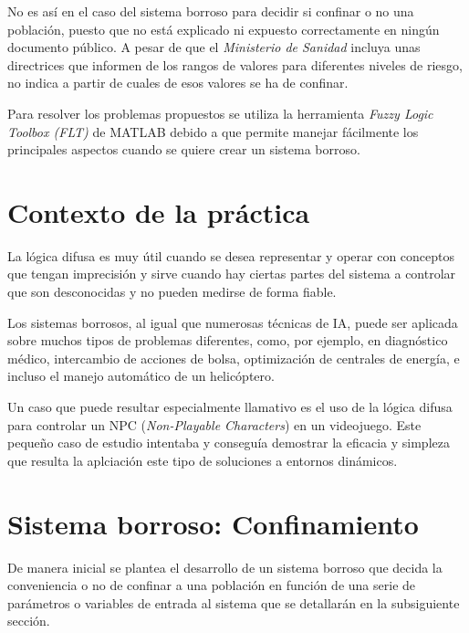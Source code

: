 \documentclass[12pt,a4paper, xcolor=table]{article}
\begin{document}
\vspace{2mm}

No es así en el caso del sistema borroso para decidir si confinar o no una población, puesto que no está explicado ni expuesto correctamente en ningún documento público. A pesar de que el \textit{Ministerio de Sanidad}\cite{poblacion} incluya unas directrices que informen de los rangos de valores para diferentes niveles de riesgo, no indica a partir de cuales de esos valores se ha de confinar.

\vspace{4mm}

Para resolver los problemas propuestos se utiliza la herramienta \textit{Fuzzy Logic Toolbox (FLT)} de MATLAB debido a que permite manejar fácilmente los principales aspectos cuando se quiere crear un sistema borroso.

\newpage

\section{Contexto de la práctica}

La lógica difusa es muy útil cuando se desea representar y operar con conceptos que tengan imprecisión y sirve cuando hay ciertas partes del sistema a controlar que son desconocidas y no pueden medirse de forma fiable.

\vspace{3mm}

Los sistemas borrosos, al igual que numerosas técnicas de IA, puede ser aplicada sobre muchos tipos de problemas diferentes, como, por ejemplo, en diagnóstico médico, intercambio de acciones de bolsa, optimización de centrales de energía, e incluso el manejo automático de un helicóptero\cite{fuzzy}.

\vspace{2mm}

Un caso que puede resultar especialmente llamativo es el uso de la lógica difusa para controlar un NPC (\textit{Non-Playable Characters}) en un videojuego\cite{fuzzygame}. Este pequeño caso de estudio intentaba y conseguía demostrar la eficacia y simpleza que resulta la aplciación este tipo de soluciones a entornos dinámicos.

\vspace{2mm}




\section{Sistema borroso: Confinamiento}
De manera inicial se plantea el desarrollo de un sistema borroso que decida la conveniencia o no de confinar a una población en función de una serie de parámetros o variables de entrada al sistema que se detallarán en la subsiguiente sección.
\end{document}
